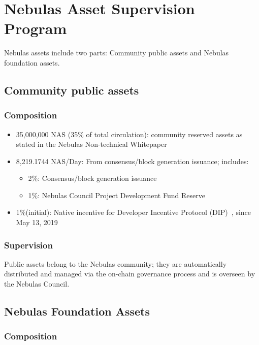 \section{Nebulas Asset Supervision Program}

Nebulas assets include two parts: Community public assets and Nebulas foundation assets.

\subsection{Community public assets}

\subsubsection{Composition}

\begin{itemize}
	\item 35,000,000 NAS (35\% of total circulation): community reserved assets as stated in the Nebulas Non-technical Whitepaper
    \item 8,219.1744 NAS/Day: From consensus/block generation issuance; includes:
	    \begin{itemize}
			\item 2\%: Consensus/block generation issuance
			\item 1\%: Nebulas Council Project Development Fund Reserve
		\end{itemize}
	\item 1\%(initial): Native incentive for Developer Incentive Protocol (DIP)~\cite{mauvepaper}, since May 13, 2019
\end{itemize}

\subsubsection{Supervision}

Public assets belong to the Nebulas community; they are automatically distributed and managed via the on-chain governance process and is overseen by the Nebulas Council.

\subsection{Nebulas Foundation Assets}

\subsubsection{Composition}

